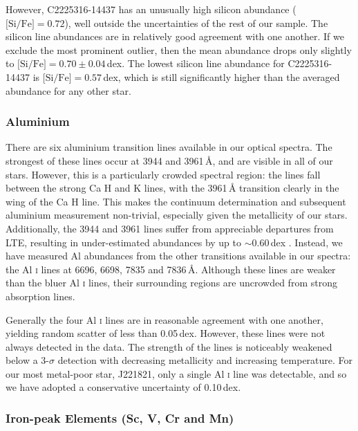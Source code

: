 \documentclass{emulateapj}
\begin{document}
However, C2225316-14437 has an unusually high silicon abundance ($\mbox{[Si/Fe]} = 0.72$), well outside the uncertainties of the rest of our sample. The silicon line abundances are in relatively good agreement with one another. If we exclude the most prominent outlier, then the mean abundance drops only slightly to $\mbox{[Si/Fe]} = 0.70 \pm 0.04$\,dex. The lowest silicon line abundance for C2225316-14437 is $\mbox{[Si/Fe]} = 0.57$\,dex, which is still significantly higher than the averaged abundance for any other star.



\subsubsection{Aluminium}
There are six aluminium transition lines available in our optical spectra. The strongest of these lines occur at 3944 and 3961\,{\AA}, and are visible in all of our stars. However, this is a particularly crowded spectral region: the lines fall between the strong Ca H and K lines, with the 3961\,{\AA} transition clearly in the wing of the Ca H line. This makes the continuum determination and subsequent aluminium measurement non-trivial, especially given the metallicity of our stars. Additionally, the 3944 and 3961 lines suffer from appreciable departures from LTE, resulting in under-estimated abundances by up to $\sim$0.60\,dex \citep{baumuller;gehren_1997}. Instead, we have measured Al abundances from the other transitions available in our spectra: the Al \textsc{i} lines at 6696, 6698, 7835 and 7836\,{\AA}. Although these lines are weaker than the bluer Al \textsc{i} lines, their surrounding regions are uncrowded from strong absorption lines.

Generally the four Al \textsc{i} lines are in reasonable agreement with one another, yielding random scatter of less than 0.05\,dex. However, these lines were not always detected in the data. The strength of the lines is noticeably weakened below a 3-$\sigma$ detection with decreasing metallicity and increasing temperature. For our most metal-poor star, J221821, only a single Al \textsc{i} line was detectable, and so we have adopted a conservative uncertainty of 0.10\,dex. 


\subsubsection{Iron-peak Elements (Sc, V, Cr and Mn)}
\end{document}
